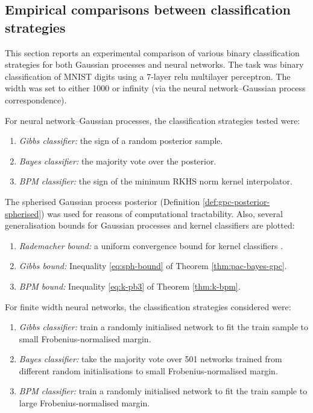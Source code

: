 \begin{refsection}
\section{Empirical comparisons between classification strategies}

This section reports an experimental comparison of various binary classification strategies for both Gaussian processes and neural networks. The task was binary classification of MNIST digits \citep{lecun2010mnist} using a 7-layer relu multilayer perceptron. The width was set to either 1000 or infinity (via the neural network--Gaussian process correspondence).

For neural network--Gaussian processes, the classification strategies tested were:
\begin{enumerate}
    \item \textit{Gibbs classifier:} the sign of a random posterior sample.
    \item \textit{Bayes classifier:} the majority vote over the posterior.
    \item \textit{BPM classifier:} the sign of the minimum RKHS norm kernel interpolator.
\end{enumerate}
The spherised Gaussian process posterior (Definition \ref{def:gpc-posterior-spherised}) was used for reasons of computational tractability. Also, several generalisation bounds for Gaussian processes and kernel classifiers are plotted:
\begin{enumerate}
    \item \textit{Rademacher bound:} a uniform convergence bound for kernel classifiers \citep[Theorem 21]{rademacher}.
    \item \textit{Gibbs bound:} Inequality \ref{eq:sph-bound} of Theorem \ref{thm:pac-bayes-gpc}.
    \item \textit{BPM bound:} Inequality \ref{eq:k-pb3} of Theorem \ref{thm:k-bpm}.
\end{enumerate}

For finite width neural networks, the classification strategies considered were:
\begin{enumerate}
    \item \textit{Gibbs classifier:} train a randomly initialised network to fit the train sample to small Frobenius-normalised margin.
    \item \textit{Bayes classifier:} take the majority vote over 501 networks trained from different random initialisations to small Frobenius-normalised margin.
    \item \textit{BPM classifier:} train a randomly initialised network to fit the train sample to large Frobenius-normalised margin.
\end{enumerate}


\end{refsection}
